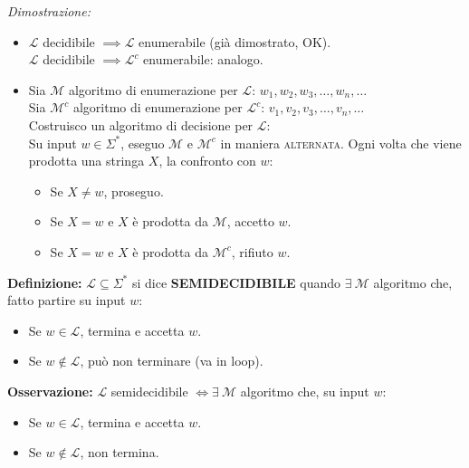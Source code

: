 \textit{Dimostrazione:}
\begin{itemize}
    \item[$\implies$)] $\mathcal{L}$ decidibile $\implies \mathcal{L}$ enumerabile (già dimostrato, OK). \\
    $\mathcal{L}$ decidibile $\implies \mathcal{L}^c$ enumerabile: analogo.
    
    \item[$\impliedby$)] Sia $\mathcal{M}$ algoritmo di enumerazione per $\mathcal{L}$: $w_1, w_2, w_3, \dots, w_n, \dots$ \\
    Sia $\mathcal{M}^c$ algoritmo di enumerazione per $\mathcal{L}^c$: $v_1, v_2, v_3, \dots, v_n, \dots$ \\
    Costruisco un algoritmo di decisione per $\mathcal{L}$: \\
    Su input $w \in \Sigma^*$, eseguo $\mathcal{M}$ e $\mathcal{M}^c$ in maniera \textsc{alternata}.
    Ogni volta che viene prodotta una stringa $X$, la confronto con $w$:
    \begin{itemize}
        \item Se $X \neq w$, proseguo.
        \item Se $X = w$ e $X$ è prodotta da $\mathcal{M}$, accetto $w$.
        \item Se $X = w$ e $X$ è prodotta da $\mathcal{M}^c$, rifiuto $w$.
    \end{itemize}
\end{itemize}

\vspace{0.4cm}
\textbf{Definizione:} $\mathcal{L} \subseteq \Sigma^*$ si dice \textbf{SEMIDECIDIBILE} quando $\exists\ \mathcal{M}$ algoritmo che, fatto partire su input $w$:
\begin{itemize}
    \item Se $w \in \mathcal{L}$, termina e accetta $w$.
    \item Se $w \notin \mathcal{L}$, può non terminare (va in loop).
\end{itemize}

\vspace{0.4cm}
\textbf{Osservazione:} $\mathcal{L}$ semidecidibile $\iff \exists\ \mathcal{M}$ algoritmo che, su input $w$:
\begin{itemize}
    \item Se $w \in \mathcal{L}$, termina e accetta $w$.
    \item Se $w \notin \mathcal{L}$, non termina.
\end{itemize}

